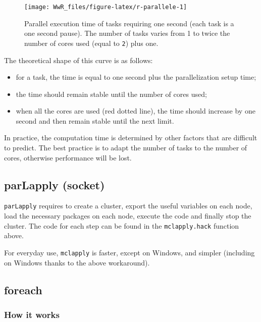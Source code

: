\documentclass[
  12pt,
  american,
  a4paper,
  extrafontsizes,onecolumn,openright
  ]{memoir}
\providecommand{\tightlist}{%
  \setlength{\itemsep}{0pt}\setlength{\parskip}{0pt}}
\newlength{\rf}
\begin{document}
\begin{figure}

{\centering \texttt{[image: WwR\_files/figure-latex/r-parallele-1]} 

}

\caption[Temps d'exécution en parallèle]{Parallel execution time of tasks requiring one second (each task is a one second pause). The number of tasks varies from 1 to twice the number of cores used (equal to \texttt{2}) plus one.}\label{fig:r-parallele}
\end{figure}

\normalsize

The theoretical shape of this curve is as follows:

\begin{itemize}
\tightlist
\item
  for a task, the time is equal to one second plus the parallelization setup time;
\item
  the time should remain stable until the number of cores used;
\item
  when all the cores are used (red dotted line), the time should increase by one second and then remain stable until the next limit.
\end{itemize}

In practice, the computation time is determined by other factors that are difficult to predict.
The best practice is to adapt the number of tasks to the number of cores, otherwise performance will be lost.

\hypertarget{parlapply-socket}{%
\subsection{parLapply (socket)}\label{parlapply-socket}}

\texttt{parLapply} requires to create a cluster, export the useful variables on each node, load the necessary packages on each node, execute the code and finally stop the cluster.
The code for each step can be found in the \texttt{mclapply.hack} function above.

For everyday use, \texttt{mclapply} is faster, except on Windows, and simpler (including on Windows thanks to the above workaround).

\hypertarget{foreach}{%
\subsection{foreach}\label{foreach}}

\hypertarget{how-it-works}{%
\subsubsection{How it works}\label{how-it-works}}
\end{document}
